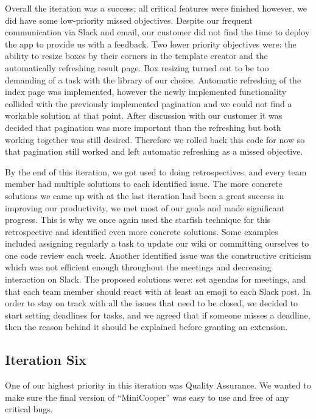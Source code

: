 \documentclass{l3proj}
\begin{document}
Overall the iteration was a success; all critical features were finished however, we did have some low-priority missed objectives. Despite our frequent communication via Slack and email, our customer did not find the time to deploy the app to provide us with a feedback. Two lower priority objectives were: the ability to resize boxes by their corners in the template creator and the automatically refreshing result page. Box resizing turned out to be too demanding of a task with the library of our choice. Automatic refreshing of the index page was implemented, however the newly implemented functionality collided with the previously implemented pagination and we could not find a workable solution at that point. After discussion with our customer it was decided that pagination was more important than the refreshing but both working together was still desired. Therefore we rolled back this code for now so that pagination still worked and left automatic refreshing as a missed objective. 

By the end of this iteration, we got used to doing retrospectives, and every team member had multiple solutions to each identified issue. The more concrete solutions we came up with at the last iteration had been a great success in improving our productivity, we met most of our goals and made significant progress. This is why we once again used the starfish technique for this retrospective and identified  even more concrete solutions. Some examples included assigning regularly a task to update our wiki or committing ourselves to one code review each week. Another identified issue was the constructive criticism which was not efficient enough throughout the meetings and decreasing interaction on Slack. The proposed solutions were: set agendas for meetings, and that each team member should react with at least an emoji to each Slack post.
In order to stay on track with all the issues that need to be closed, we decided to start setting deadlines for tasks, and we agreed that if someone misses a deadline, then the reason behind it should be explained before granting an extension.

\subsection{Iteration Six}

One of our highest priority in this iteration was Quality Assurance. We wanted to make sure the final version of ``MiniCooper'' was easy to use and free of any critical bugs.
\end{document}
